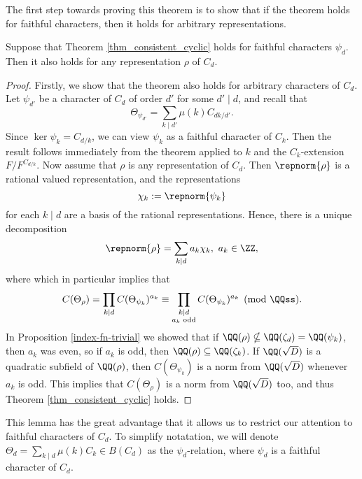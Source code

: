 The first step towards proving this theorem is to show that if the theorem holds for faithful characters, then it holds for arbitrary representations. 

\begin{lemma}
    Suppose that Theorem \ref{thm_consistent_cyclic} holds for faithful characters $\psi_d$. Then it also holds for any representation $\rho$ of $C_d$.
\end{lemma}
\begin{proof}
    Firstly, we show that the theorem also holds for arbitrary characters of $C_d$. Let $\psi_{d'}$ be a character of $C_d$ of order $d'$ for some $d'\mid d$, and recall that 
    $$\Theta_{\psi_{d'}}=\sum_{k\mid d'}\mu(k)C_{dk/d'}.$$ Since $\ker\psi_k=C_{d/k}$, we can view $\psi_k$ as a faithful character of $C_k$. Then the result follows immediately from the theorem applied to $k$ and the $C_k$-extension $F/F^{C_{d/k}}$.
    Now assume that $\rho$ is any representation of $C_d$. Then $\repnorm{\rho}$ is a rational valued representation, and the representations
    $$\chi_k:=\repnorm{\psi_k}$$
    for each $k\mid d$ are a basis of the rational representations. Hence, there is a unique decomposition
    $$\repnorm{\rho}=\sum_{k\mid d}a_k\chi_k,\ a_k\in\ZZ,$$
    where
    which in particular implies that 
    $$C(\Theta_\rho)=\prod_{k\mid d}C(\Theta_{\psi_k})^{a_k}\equiv \prod_{\substack{k\mid d \\ a_k\text{ odd}} }C(\Theta_{\psi_k})^{a_k}\pmod{\QQss}.$$
    In Proposition \ref{index-fn-trivial} we showed that if $\QQ(\rho)\nsubseteq \QQ(\zeta_d)=\QQ(\psi_k)$, then $a_k$ was even, so if $a_k$ is odd, then $\QQ(\rho)\subseteq\QQ(\zeta_k)$. If $\QQ(\sqrt{D})$ is a quadratic subfield of $\QQ(\rho)$, then $C(\Theta_{\psi_k})$ is a norm from $\QQ(\sqrt{D})$ whenever $a_k$ is odd. This implies that $C(\Theta_\rho)$ is a norm from $\QQ(\sqrt{D})$ too, and thus Theorem \ref{thm_consistent_cyclic} holds.
\end{proof}

This lemma has the great advantage that it allows us to restrict our attention to faithful characters of $C_d$. To simplify notatation, we will denote $\Theta_d=\sum_{k\mid d}\mu(k)C_k\in B(C_d)$ as the $\psi_d$-relation, where $\psi_d$ is a faithful character of $C_d$.


